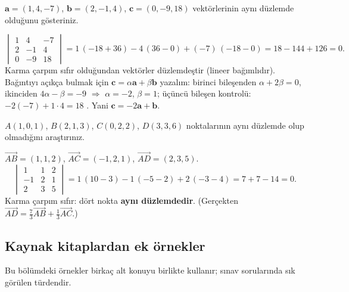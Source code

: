 \begin{soru}
$\mathbf a=(1,4,-7)$, $\mathbf b=(2,-1,4)$, $\mathbf c=(0,-9,18)$ vektörlerinin aynı düzlemde olduğunu gösteriniz.
\end{soru}
\begin{cevap}
\[
\begin{vmatrix}1&4&-7\\2&-1&4\\0&-9&18\end{vmatrix}
=1\,(-18+36)-4\,(36-0)+(-7)\,(-18-0)=18-144+126=0 .
\]
Karma çarpım sıfır olduğundan vektörler düzlemdeştir (lineer bağımlıdır). Bağıntıyı açıkça bulmak için $\mathbf c=\alpha\mathbf a+\beta\mathbf b$ yazalım: birinci bileşenden $\alpha+2\beta=0$, ikinciden $4\alpha-\beta=-9$ $\Rightarrow$ $\alpha=-2$, $\beta=1$; üçüncü bileşen kontrolü: $-2(-7)+1\cdot4=18$ \checkmark. Yani $\mathbf c=-2\mathbf a+\mathbf b$.
\end{cevap}

\begin{soru}
$A(1,0,1)$, $B(2,1,3)$, $C(0,2,2)$, $D(3,3,6)$ noktalarının aynı düzlemde olup olmadığını araştırınız.
\end{soru}
\begin{cevap}
$\overrightarrow{AB}=(1,1,2)$, $\overrightarrow{AC}=(-1,2,1)$, $\overrightarrow{AD}=(2,3,5)$.
\[
\begin{vmatrix}1&1&2\\-1&2&1\\2&3&5\end{vmatrix}=1\,(10-3)-1\,(-5-2)+2\,(-3-4)=7+7-14=0 .
\]
Karma çarpım sıfır: dört nokta \textbf{aynı düzlemdedir}. (Gerçekten $\overrightarrow{AD}=\frac73\overrightarrow{AB}+\frac13\overrightarrow{AC}$.)
\end{cevap}

\subsection{Kaynak kitaplardan ek örnekler}

Bu bölümdeki örnekler birkaç alt konuyu birlikte kullanır; sınav sorularında sık görülen türdendir.

